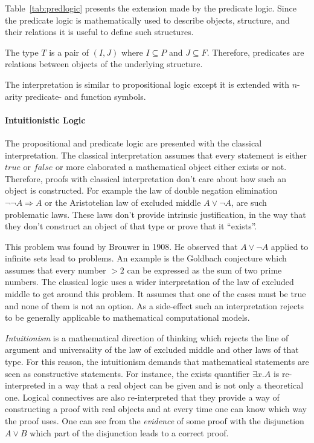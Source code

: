 Table~\ref{tab:predlogic} presents the extension made by the predicate logic.
Since the predicate logic is mathematically used to describe objects,
structure, and their relations it is useful to define such structures.~\cite{heinemann2013logik}

\begin{defi}
  The type $T$ is a pair of $(I,J)$ where $I\subseteq P$ and $J\subseteq F$.
  Therefore, predicates are relations between objects of the underlying
  structure.
\end{defi}

The interpretation is similar to propositional logic except it is
extended with $n$-arity predicate- and function symbols.~\cite{heinemann2013logik}

\paragraph{Intuitionistic Logic}
The propositional and predicate logic are presented with the classical
interpretation. The classical interpretation assumes that every statement
is either $true$ or $false$ or more elaborated a mathematical object either
exists or not. Therefore, proofs with classical interpretation don't care
about how such an object is constructed. For example the law of double
negation elimination  $\neg\neg A\Rightarrow A$ or the Aristotelian law of excluded
middle $A \vee \neg A$, are such problematic laws. These laws don't provide
intrinsic justification, in the way that they don't construct an object
of that type or prove that it ``exists''.~\cite{sep-logic-intuitionistic, kreitz1994automatisierte}

This problem was found by Brouwer in 1908. He observed that $A \vee \neg A$
applied to infinite sets lead to problems. An example is the Goldbach
conjecture which assumes that every number $> 2$ can be expressed as the
sum of two prime numbers. The classical logic uses a wider interpretation
of the law of excluded middle to get around this problem. It assumes
that one of the cases must be true and none of them is not an option.
As a side-effect such an interpretation rejects to be generally
applicable to mathematical computational models.~\cite{sep-logic-intuitionistic, sep-mathematics-constructive}

\textit{Intuitionism} is a mathematical direction of thinking which
rejects the line of argument and universality of the law of excluded middle
and other laws of that type. For this reason, the intuitionism demands
that mathematical statements are seen as constructive statements.
For instance, the exists quantifier $\exists x.A$ is re-interpreted in a way
that a real object can be given and is not only a theoretical one.
Logical connectives are also re-interpreted that they provide a way
of constructing a proof with real objects and at every time one can
know which way the proof uses. One can see from the \textit{evidence}
of some proof with the disjunction $A\vee B$ which part of the disjunction
leads to a correct proof.~\cite{kreitz1994automatisierte}

